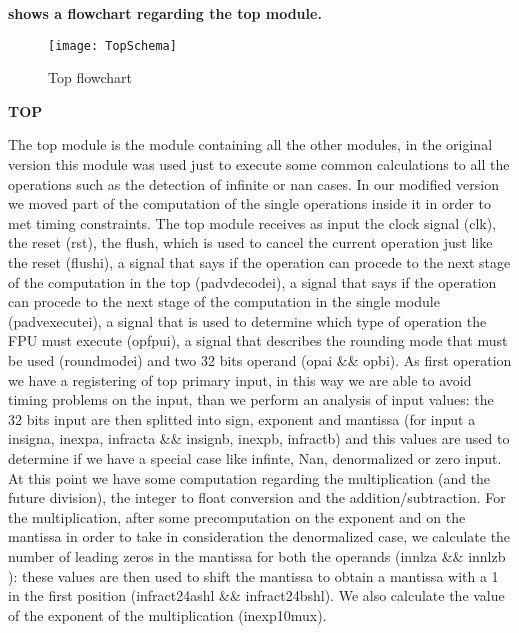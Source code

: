 \textbf{
 shows a flowchart regarding the top module.}
\newline

\begin{figure}
\centering\texttt{[image: TopSchema]}
\caption{Top flowchart}	
\label{fig:top_schema}
\end{figure}

\textbf{TOP}
\newline

The top module is the module containing all the other modules, in the original version this module was used just to execute some common calculations to all the operations such as the detection of infinite or nan cases. In our modified version we moved part of the computation of the single operations inside it in order to met timing constraints.
The top module receives as input the clock signal (clk), the reset (rst), the flush, which is used to cancel the current operation just like the reset (flush\textunderscore i), a signal that says if the operation can procede to the next stage of the computation in the top (padv\textunderscore decode\textunderscore i), a signal that says if the operation can procede to the next stage of the computation in the single module (padv\textunderscore execute\textunderscore i), a signal that is used to determine which type of operation the FPU must execute (op\textunderscore fpu\textunderscore i), a signal that describes the rounding mode that must be used (round\textunderscore mode\textunderscore i) and two 32 bits operand (opa\textunderscore i \&\& opb\textunderscore i).
As first operation we have a registering of top primary input, in this way we are able to avoid timing problems on the input, than we perform an analysis of input values: the 32 bits input are then splitted into sign, exponent and mantissa (for input a in\textunderscore signa, in\textunderscore expa, in\textunderscore fracta \&\& in\textunderscore signb, in\textunderscore expb, in\textunderscore fractb) and this values are used to determine if we have a special case like infinte, Nan, denormalized or zero input.
At this point we have some computation regarding the multiplication (and the future division), the integer to float conversion and the addition/subtraction. 
For the multiplication, after some precomputation on the exponent and on the mantissa in order to take in consideration the denormalized case, we calculate the number of leading zeros in the mantissa for both the operands (in\textunderscore nlza \&\& in\textunderscore nlzb ): these values are then used to shift the mantissa to obtain a mantissa with a 1 in the first position (in\textunderscore fract24a\textunderscore shl \&\& in\textunderscore fract24b\textunderscore shl). We also calculate the value of the exponent of the multiplication (in\textunderscore exp10mux). 


